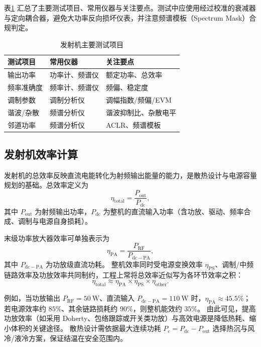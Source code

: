 表\ref{tab:tx_test} 汇总了主要测试项目、常用仪器与关注要点。测试中应使用经过校准的衰减器与定向耦合器，避免大功率反向损坏仪表，并注意频谱模板（Spectrum Mask）合规判定。

\begin{table}[htbp]
\centering
\caption{发射机主要测试项目}
\label{tab:tx_test}
\begin{tabular}{|p{3cm}|p{4cm}|p{5cm}|}
\hline
\textbf{测试项目} & \textbf{常用仪器} & \textbf{关注要点} \\
\hline
输出功率 & 功率计、频谱仪 & 额定功率、总效率 \\
\hline
频率准确度 & 频率计、频谱仪 & 频偏、稳定度 \\
\hline
调制参数 & 调制分析仪 & 调幅指数/频偏/EVM \\
\hline
谐波/杂散 & 频谱分析仪 & 谐波抑制比、杂散电平 \\
\hline
邻道功率 & 频谱分析仪 & ACLR、频谱模板 \\
\hline
\end{tabular}
\end{table}

\subsection{发射机效率计算}

发射机的总效率反映直流电能转化为射频输出能量的能力，是散热设计与电源容量规划的基础。总效率定义为
\begin{equation}
\eta_{\mathrm{total}} = \frac{P_{\mathrm{out}}}{P_{\mathrm{dc}}},
\end{equation}
其中 $P_{\mathrm{out}}$ 为射频输出功率，$P_{\mathrm{dc}}$ 为整机的直流输入功率（含功放、驱动、频率合成、调制与电源自身损耗）。

末级功率放大器效率可单独表示为
\begin{equation}
\eta_{\mathrm{PA}} = \frac{P_{\mathrm{RF}}}{P_{\mathrm{dc-PA}}},
\end{equation}
其中 $P_{\mathrm{dc-PA}}$ 为功放级直流功耗。
整机效率同时受电源变换效率 $\eta_{\mathrm{PS}}$、调制/中频链路效率及功放效率共同制约，工程上常将总效率近似写为各环节效率之积：
\begin{equation}
\eta_{\mathrm{total}} \approx \eta_{\mathrm{PA}}\times \eta_{\mathrm{PS}} \times \eta_{\mathrm{other}}.
\end{equation}

例如，当功放输出 $P_{\mathrm{RF}}=50\ \mathrm{W}$、直流输入 $P_{\mathrm{dc-PA}}=110\ \mathrm{W}$ 时，$\eta_{\mathrm{PA}}\approx 45.5\%$；若电源效率约 $85\%$、其余链路损耗约 $90\%$，则整机能效约 $35\%$。
由此可见，提高功放效率（如采用 Doherty、包络跟踪或开关类功放）与高效电源是降低热耗、缩小体积的关键途径。
散热设计需依据最大连续功耗 $P_c=P_{\mathrm{dc}}-P_{\mathrm{out}}$ 选择热沉与风冷/液冷方案，保证结温在安全范围内。
